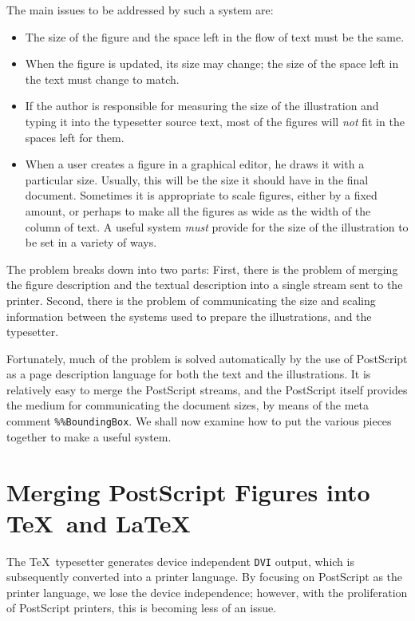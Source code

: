 The main issues to be addressed by such a system are:
\begin{itemize}
\item	The size of the figure and the space left in the flow of
	text must be the same.
\item	When the figure is updated, its size may change;
	the size of the space left in the text must change to match.
\item	If the author is responsible for measuring the size of the
	illustration and typing it into the typesetter source text,
	most of the figures will {\em not} fit in the spaces left for them.
\item	When a user creates a figure in a graphical editor,
	he draws it with a particular size.
	Usually, this will be the size it should have in the final document.
	Sometimes it is appropriate to scale figures,
	either by a fixed amount, or perhaps
	to make all the figures as wide as the width of the column of text.
	A useful system {\em must} provide for the size of the illustration
	to be set in a variety of ways.
\end{itemize}

The problem breaks down into two parts:
First, there is the problem of merging the figure description
and the textual description into a single stream sent to the printer.
Second, there is the problem of communicating the size and scaling
information between the systems used to prepare the illustrations,
and the typesetter.

Fortunately, much of the problem is solved automatically
by the use of PostScript \cite{Adobe:postscript} as a page description language
for both the text and the illustrations.
It is relatively easy to merge the PostScript streams,
and the PostScript itself provides the medium for
communicating the document sizes,
by means of the meta comment
\verb|%%BoundingBox|.
We shall now examine how to put the various pieces together
to make a useful system.

\section{Merging PostScript Figures into \TeX\ and \LaTeX}

The \TeX\ typesetter
generates device independent {\tt DVI} output,
which is subsequently converted into a printer language.
By focusing on PostScript as the printer language,
we lose the device independence;
however, with the proliferation of PostScript printers,
this is becoming less of an issue.

